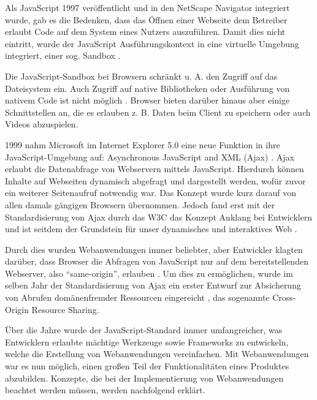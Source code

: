 
Als JavaScript 1997 veröffentlicht und in den NetScape Navigator integriert wurde, gab es die Bedenken, dass das Öffnen einer Webseite dem Betreiber erlaubt Code auf dem System eines Nutzers auszuführen. Damit dies nicht eintritt, wurde der JavaScript Ausführungskontext in eine virtuelle Umgebung integriert, einer sog. Sandbox \cite{LearningJavaScript}.

Die JavaScript-Sandbox bei Browsern schränkt u. A. den Zugriff auf das Dateisystem ein. Auch Zugriff auf native Bibliotheken oder Ausführung von nativem Code ist nicht möglich \cite{TheSpyInTheSandbox}. Browser bieten darüber hinaus aber einige Schnittstellen an, die es erlauben z. B. Daten beim Client zu speichern oder auch Videos abzuspielen.


1999 nahm Microsoft im Internet Explorer 5.0 eine neue Funktion in ihre JavaScript-Umgebung auf: Asynchronous JavaScript and XML (Ajax) \cite{MDNAjax}. Ajax erlaubt die Datenabfrage von Webservern mittels JavaScript. Hierdurch können Inhalte auf Webseiten dynamisch abgefragt und dargestellt werden, wofür zuvor ein weiterer Seitenaufruf notwendig war. Das Konzept wurde kurz darauf von allen damals gängigen Browsern übernommen. Jedoch fand erst mit der Standardisierung von Ajax durch das W3C \cite{TheXMLHttpRequestObject} das Konzept Anklang bei Entwicklern \cite{AngularForEnterpriseReadyWebApplications} \cite{FinkIntroducingSPAs} und ist seitdem der Grundstein für unser dynamisches und interaktives Web \cite{ResearchOnAJAXTechnology}.

Durch dies wurden Webanwendungen immer beliebter, aber Entwickler klagten darüber, dass Browser die Abfragen von JavaScript nur auf dem bereitstellenden Webserver, also \enquote{same-origin}, erlauben \cite{CrossSiteXHRWithCORS}. Um dies zu ermöglichen, wurde im selben Jahr der Standardisierung von Ajax ein erster Entwurf zur Absicherung von Abrufen domänenfremder Ressourcen eingereicht \cite{AuthorizingCORS}, das sogenannte Cross-Origin Resource Sharing.

Über die Jahre wurde der JavaScript-Standard immer umfangreicher, was Entwicklern erlaubte mächtige Werkzeuge sowie Frameworks zu entwickeln, welche die Erstellung von Webanwendungen vereinfachen. Mit Webanwendungen war es nun möglich, einen großen Teil der Funktionalitäten eines Produktes abzubilden. Konzepte, die bei der Implementierung von Webanwendungen beachtet werden müssen, werden nachfolgend erklärt.

